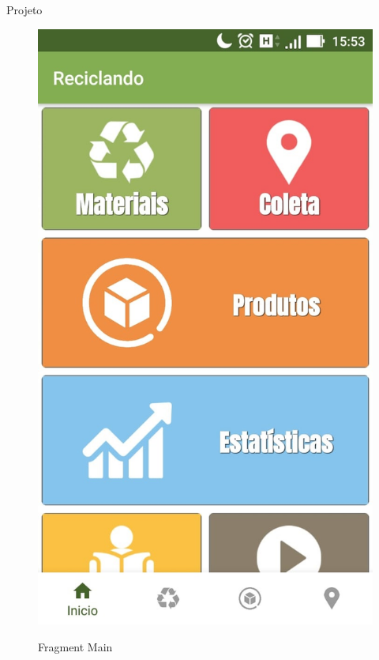 \documentclass[
	12pt,				%
	openright,			%
	twoside,			%
	a4paper,			%
	english,			%
	french,				%
	spanish,			%
	brazil				%
	]{abntex2}
\begin{document}
\begin{chapter}{Projeto}
\begin{figure}[h]
\centering
   \caption{Fragment Main}
   \includegraphics[scale=0.4]{media/fragment_main.jpg}
     \label{fig:fragment_main_app}
\end{figure}

\begin{lstlisting}[numbers=none,
basicstyle=\small,
caption={FragmentMain.java},
title={FragmentMain.java},
label={FragmentMain.java}]


\end{lstlisting}
\end{chapter}
\end{document}
